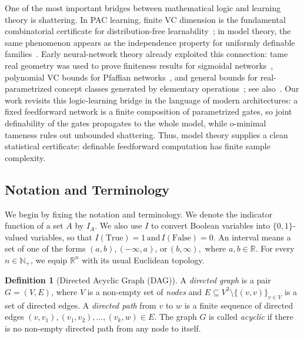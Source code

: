 \documentclass{article}
\theoremstyle{plain}
\theoremstyle{definition}
\newtheorem{definition}[theorem]{Definition}
\theoremstyle{remark}
\newcommand{\reals}{\mathbb{R}}
\newcommand{\mSet}[1]{\big\{#1\big\}}
\theoremstyle{plain}
\numberwithin{thm}{section}
\theoremstyle{definition}
\numberwithin{equation}{section}
\begin{document}
One of the most important bridges between mathematical logic and learning theory is shattering.  In PAC learning, finite VC dimension is the fundamental combinatorial certificate for distribution-free learnability~\citep{BlumerEhrenfeuchtHausslerWarmuth1989,AnthonyBartlett1999}; in model theory, the same phenomenon appears as the independence property for uniformly definable families~\citep{Laskowski1992,ChaseFreitag2019}.  Early neural-network theory already exploited this connection: tame real geometry was used to prove finiteness results for sigmoidal networks~\citep{MacintyreSontag1993}, polynomial VC bounds for Pfaffian networks~\citep{KarpinskiMacintyre1997}, and general bounds for real-parametrized concept classes generated by elementary operations~\citep{GoldbergJerrum1995}; see also~\citep{BartlettMaass2003}.  Our work revisits this logic-learning bridge in the language of modern architectures: a fixed feedforward network is a finite composition of parametrized gates, so joint definability of the gates propagates to the whole model, while o-minimal tameness rules out unbounded shattering.  Thus, model theory supplies a clean statistical certificate: definable feedforward computation has finite sample complexity.

\subsection{Notation and Terminology}

We begin by fixing the notation and terminology.  We denote the indicator function of a set $A$ by $I_A$.  We also use $I$ to convert Boolean variables into $\{0,1\}$-valued variables, so that
$
    I(\mathrm{True})=1
    \,\text{and}\,
    I(\mathrm{False})=0.
$
An interval means a set of one of the forms
$
    (a,b), (-\infty,a), \,\text{or}\, (b,\infty),
$
where $a,b\in\reals$.  For every $n\in\mathbb{N}_+$, we equip $\reals^n$ with its usual Euclidean topology.

\begin{definition}[Directed Acyclic Graph (DAG)]
\label{def:dag}
A \emph{directed graph} is a pair $G=(V,E)$, where $V$ is a non-empty set of \emph{nodes} and
$
    E\subseteq V^2\setminus \mSet{(v,v)}_{v\in V}
$
is a set of directed edges.  A \emph{directed path} from $v$ to $w$ is a finite sequence of directed edges
$
    (v,v_1),(v_1,v_2),\dots,(v_k,w)\in E.
$
The graph $G$ is called \emph{acyclic} if there is no non-empty directed path from any node to itself.
\end{definition}
\end{document}
